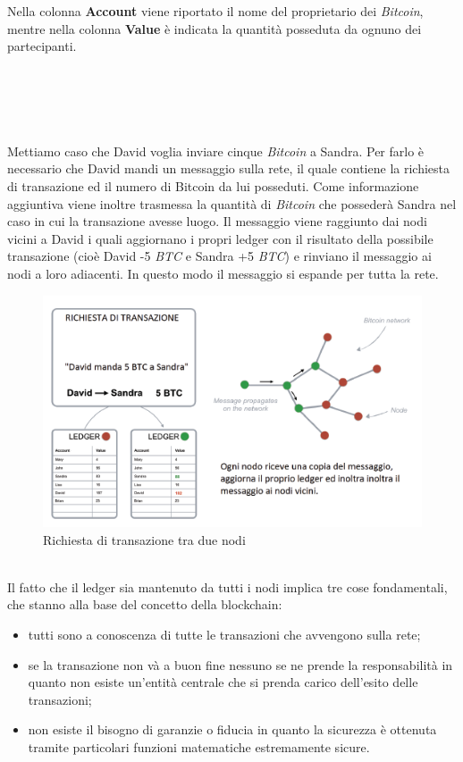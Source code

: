 \documentclass[11pt]{thesistemp}
\begin{document}
Nella colonna \textbf{Account} viene riportato il nome del proprietario dei \textit{Bitcoin}, mentre nella colonna \textbf{Value} è indicata la quantità posseduta da ognuno dei partecipanti.\\\\\\\\\\\\
Mettiamo caso che David voglia inviare cinque \textit{Bitcoin} a Sandra.
Per farlo è necessario che David mandi un messaggio sulla rete, il quale contiene la richiesta di transazione ed il numero di Bitcoin da lui posseduti.
Come informazione aggiuntiva viene inoltre trasmessa la quantità di \textit{Bitcoin} che possederà Sandra nel caso in cui la transazione avesse luogo. 
Il messaggio viene raggiunto dai nodi vicini a David i quali aggiornano i propri ledger con il risultato della possibile transazione (cioè David -5 \textit{BTC} e Sandra +5 \textit{BTC}) e rinviano il messaggio ai nodi a loro adiacenti. 
In questo modo il messaggio si espande per tutta la rete.
\begin{figure}[h]\hfill
    \centering
    \includegraphics[width=\textwidth]{transaction.png}
    \caption{ Richiesta di transazione tra due nodi}
    \label{fig:transaction}
\end{figure}\\
Il fatto che il ledger sia mantenuto da tutti i nodi implica tre cose fondamentali, che stanno alla base del concetto della blockchain:
\begin{itemize}
\item  tutti sono a conoscenza di tutte le transazioni che avvengono sulla rete;
\item se la transazione non và a buon fine nessuno se ne prende la responsabilità in quanto non esiste un’entità centrale che si prenda carico dell’esito delle transazioni;
\item non esiste il bisogno di garanzie o fiducia in quanto la sicurezza è ottenuta tramite particolari funzioni matematiche estremamente sicure.
\end{itemize} 
\pagebreak
\end{document}
